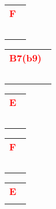 \documentclass[12pt,a4paper,openany,UTF8]{memoir}
\begin{document}
\begin{tabular}[b]{l}
    \textbf{\textcolor{red}{F\ }}\\~\mbox{}\end{tabular}\begin{tabular}[b]{l}
    \textbf{\textcolor{red}{B7(b9)\ }}\\~\mbox{}\end{tabular}\begin{tabular}[b]{l}
    \textbf{\textcolor{red}{E\ }}\\~\mbox{}\end{tabular}\begin{tabular}[b]{l}
    \textbf{\textcolor{red}{F\ }}\\~\mbox{}\end{tabular}\begin{tabular}[b]{l}
    \textbf{\textcolor{red}{E\ }}\\\mbox{}\end{tabular}

    \vspace{\parskip}
\end{document}
